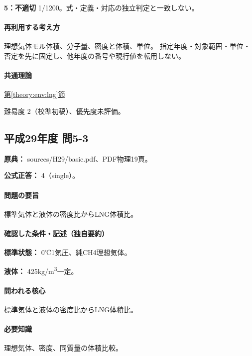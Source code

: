 \noindent\textbf{5：不適切} 1/1200。式・定義・対応の独立判定と一致しない。\par

\paragraph{再利用する考え方} 理想気体モル体積、分子量、密度と体積、単位。 指定年度・対象範囲・単位・否定を先に固定し、他年度の番号や現行値を転用しない。

\paragraph{共通理論} \hyperref[theory:env:lng]{第\ref*{theory:env:lng}節}

\par 難易度 2（校準初稿）、優先度未評価。

\subsection{平成29年度 問5-3}
\label{q:h29-reg-basic-5-3}

\noindent\textbf{原典：} sources/H29/basic.pdf、PDF物理19頁。

\textbf{公式正答：} 4（single）。

\paragraph{問題の要旨} 標準気体と液体の密度比からLNG体積比。

\paragraph{確認した条件・記述（独自要約）}\mbox{}\par

\noindent\textbf{標準状態：} 0℃1気圧、純CH4理想気体。\par

\noindent\textbf{液体：} 425kg/m\textsuperscript{3}一定。\par

\paragraph{問われる核心} 標準気体と液体の密度比からLNG体積比。

\paragraph{必要知識} 理想気体、密度、同質量の体積比較。

